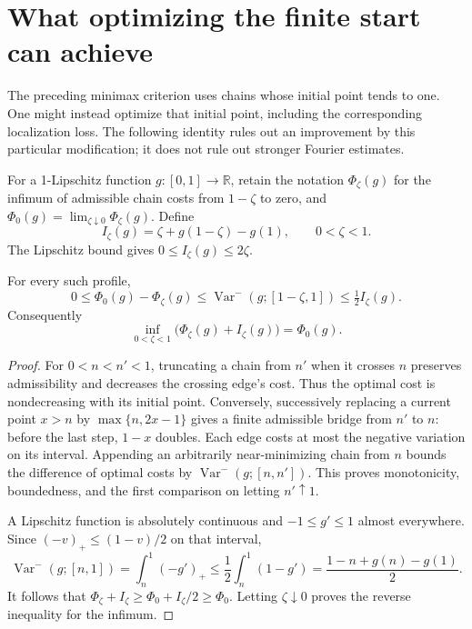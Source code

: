 \clearpage
\section{What optimizing the finite start can achieve}\label{start:section}
The preceding minimax criterion uses chains whose initial point tends to one.
One might instead optimize that initial point, including the corresponding
localization loss. The following identity rules out an improvement by this
particular modification; it does not rule out stronger Fourier estimates.

For a 1-Lipschitz function \(g:[0,1]\to\mathbb R\), retain the notation
\(\Phi_\zeta(g)\) for the infimum of admissible chain costs from
\(1-\zeta\) to zero, and \(\Phi_0(g)=\lim_{\zeta\downarrow0}\Phi_\zeta(g)\).
Define
\[
 I_\zeta(g)=\zeta+g(1-\zeta)-g(1),\qquad 0<\zeta<1.
\]
The Lipschitz bound gives \(0\le I_\zeta(g)\le2\zeta\).

\begin{proposition}\label{start:identity}
For every such profile,
\[
 0\le\Phi_0(g)-\Phi_\zeta(g)
 \le\operatorname{Var}^-(g;[1-\zeta,1])\le\tfrac12 I_\zeta(g).
\]
Consequently
\[
 \inf_{0<\zeta<1}\bigl(\Phi_\zeta(g)+I_\zeta(g)\bigr)=\Phi_0(g).
\]
\end{proposition}
\begin{proof}
For \(0<n<n'<1\), truncating a chain from \(n'\) when it crosses
\(n\) preserves admissibility and decreases the crossing edge's cost.
Thus the optimal cost is nondecreasing with its initial point. Conversely,
successively replacing a current point \(x>n\) by \(\max\{n,2x-1\}\)
gives a finite admissible bridge from \(n'\) to \(n\): before the last
step, \(1-x\) doubles. Each edge costs at most the negative variation
on its interval. Appending an arbitrarily near-minimizing chain from
\(n\) bounds the difference of optimal costs by
\(\operatorname{Var}^-(g;[n,n'])\). This proves monotonicity,
boundedness, and the first comparison on letting \(n'\uparrow1\).

A Lipschitz function is absolutely continuous and \(-1\le g'\le1\)
almost everywhere. Since \((-v)_+\le(1-v)/2\) on that interval,
\[
 \operatorname{Var}^-(g;[n,1])
 =\int_n^1(-g')_+
 \le\frac12\int_n^1(1-g')
 =\frac{1-n+g(n)-g(1)}2.
\]
It follows that \(\Phi_\zeta+I_\zeta\ge\Phi_0+I_\zeta/2\ge\Phi_0\).
Letting \(\zeta\downarrow0\) proves the reverse inequality for the infimum.
\end{proof}

